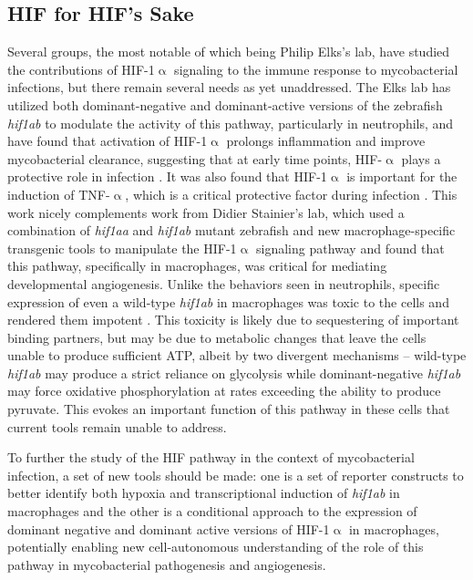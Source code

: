 \subsection{HIF for HIF's Sake}

\citep{Cardoso2015, Cramer2003, Dayan2008, Elks2015, Hammond2020, Kuhlicke2007, Li2021, Ogryzko2019, Santhakumar2012, Schild2020, Teran2022, Thompson2014}

Several groups, the most notable of which being Philip Elks's lab, have studied the contributions of HIF-1$\upalpha$ signaling to the immune response to mycobacterial infections, but there remain several needs as yet unaddressed. The Elks lab has utilized both dominant-negative and dominant-active versions of the zebrafish \textit{hif1ab} to modulate the activity of this pathway, particularly in neutrophils, and have found that activation of HIF-1$\upalpha$ prolongs inflammation and improve mycobacterial clearance, suggesting that at early time points, HIF-$\upalpha$ plays a protective role in infection \citep{Elks2011, Elks2013}. It was also found that HIF-1$\upalpha$ is important for the induction of TNF-$\upalpha$, which is a critical protective factor during infection \citep{Lewis2019, Flynn1995}. This work nicely complements work from Didier Stainier's lab, which used a combination of \textit{hif1aa} and \textit{hif1ab} mutant zebrafish and new macrophage-specific transgenic tools to manipulate the HIF-1$\upalpha$ signaling pathway and found that this pathway, specifically in macrophages, was critical for mediating developmental angiogenesis. Unlike the behaviors seen in neutrophils, specific expression of even a wild-type \textit{hif1ab} in macrophages was toxic to the cells and rendered them impotent \citep{Gerri2017}. This toxicity is likely due to sequestering of important binding partners, but may be due to metabolic changes that leave the cells unable to produce sufficient ATP, albeit by two divergent mechanisms -- wild-type \textit{hif1ab} may produce a strict reliance on glycolysis while dominant-negative \textit{hif1ab} may force oxidative phosphorylation at rates exceeding the ability to produce pyruvate. This evokes an important function of this pathway in these cells that current tools remain unable to address. 

To further the study of the HIF pathway in the context of mycobacterial infection, a set of new tools should be made: one is a set of reporter constructs to better identify both hypoxia and transcriptional induction of \textit{hif1ab} in macrophages and the other is a conditional approach to the expression of dominant negative and dominant active versions of HIF-1$\upalpha$ in macrophages, potentially enabling new cell-autonomous understanding of the role of this pathway in mycobacterial pathogenesis and angiogenesis.

